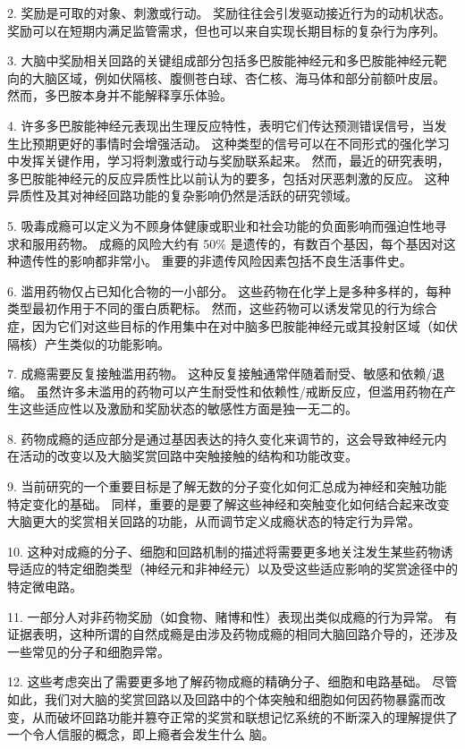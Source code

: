 2. 奖励是可取的对象、刺激或行动。 奖励往往会引发驱动接近行为的动机状态。 奖励可以在短期内满足监管需求，但也可以来自实现长期目标的复杂行为序列。 

3. 大脑中奖励相关回路的关键组成部分包括多巴胺能神经元和多巴胺能神经元靶向的大脑区域，例如伏隔核、腹侧苍白球、杏仁核、海马体和部分前额叶皮层。 然而，多巴胺本身并不能解释享乐体验。 

4. 许多多巴胺能神经元表现出生理反应特性，表明它们传达预测错误信号，当发生比预期更好的事情时会增强活动。 这种类型的信号可以在不同形式的强化学习中发挥关键作用，学习将刺激或行动与奖励联系起来。 然而，最近的研究表明，多巴胺能神经元的反应异质性比以前认为的要多，包括对厌恶刺激的反应。 这种异质性及其对神经回路功能的复杂影响仍然是活跃的研究领域。 

5. 吸毒成瘾可以定义为不顾身体健康或职业和社会功能的负面影响而强迫性地寻求和服用药物。 成瘾的风险大约有 50\% 是遗传的，有数百个基因，每个基因对这种遗传性的影响都非常小。 重要的非遗传风险因素包括不良生活事件史。 

6. 滥用药物仅占已知化合物的一小部分。 这些药物在化学上是多种多样的，每种类型最初作用于不同的蛋白质靶标。 然而，这些药物可以诱发常见的行为综合症，因为它们对这些目标的作用集中在对中脑多巴胺能神经元或其投射区域（如伏隔核）产生类似的功能影响。 

7. 成瘾需要反复接触滥用药物。 这种反复接触通常伴随着耐受、敏感和依赖/退缩。 虽然许多未滥用的药物可以产生耐受性和依赖性/戒断反应，但滥用药物在产生这些适应性以及激励和奖励状态的敏感性方面是独一无二的。 

8. 药物成瘾的适应部分是通过基因表达的持久变化来调节的，这会导致神经元内在活动的改变以及大脑奖赏回路中突触接触的结构和功能改变。 

9. 当前研究的一个重要目标是了解无数的分子变化如何汇总成为神经和突触功能特定变化的基础。 同样，重要的是要了解这些神经和突触变化如何结合起来改变大脑更大的奖赏相关回路的功能，从而调节定义成瘾状态的特定行为异常。 

10. 这种对成瘾的分子、细胞和回路机制的描述将需要更多地关注发生某些药物诱导适应的特定细胞类型（神经元和非神经元）以及受这些适应影响的奖赏途径中的特定微电路。

11. 一部分人对非药物奖励（如食物、赌博和性）表现出类似成瘾的行为异常。 有证据表明，这种所谓的自然成瘾是由涉及药物成瘾的相同大脑回路介导的，还涉及一些常见的分子和细胞异常。 

12. 这些考虑突出了需要更多地了解药物成瘾的精确分子、细胞和电路基础。 尽管如此，我们对大脑的奖赏回路以及回路中的个体突触和细胞如何因药物暴露而改变，从而破坏回路功能并篡夺正常的奖赏和联想记忆系统的不断深入的理解提供了一个令人信服的概念，即上瘾者会发生什么 脑。

